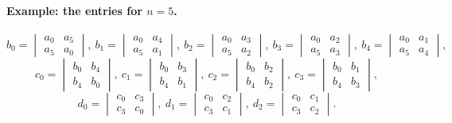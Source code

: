 \paragraph{Example: the entries for $n=5$.}
\[
  b_0=\begin{vmatrix}a_0&a_5\\a_5&a_0\end{vmatrix},\
  b_1=\begin{vmatrix}a_0&a_4\\a_5&a_1\end{vmatrix},\
  b_2=\begin{vmatrix}a_0&a_3\\a_5&a_2\end{vmatrix},\
  b_3=\begin{vmatrix}a_0&a_2\\a_5&a_3\end{vmatrix},\
  b_4=\begin{vmatrix}a_0&a_1\\a_5&a_4\end{vmatrix},
\]
\[
  c_0=\begin{vmatrix}b_0&b_4\\b_4&b_0\end{vmatrix},\
  c_1=\begin{vmatrix}b_0&b_3\\b_4&b_1\end{vmatrix},\
  c_2=\begin{vmatrix}b_0&b_2\\b_4&b_2\end{vmatrix},\
  c_3=\begin{vmatrix}b_0&b_1\\b_4&b_3\end{vmatrix},
\]
\[
  d_0=\begin{vmatrix}c_0&c_3\\c_3&c_0\end{vmatrix},\
  d_1=\begin{vmatrix}c_0&c_2\\c_3&c_1\end{vmatrix},\
  d_2=\begin{vmatrix}c_0&c_1\\c_3&c_2\end{vmatrix}.
\]

